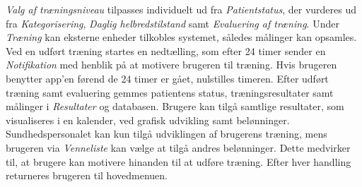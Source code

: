 \textit{Valg af træningsniveau} tilpasses individuelt ud fra \textit{Patientstatus}, der vurderes ud fra \textit{Kategorisering}, \textit{Daglig helbredstilstand} samt \textit{Evaluering af træning}.
Under \textit{Træning} kan eksterne enheder tilkobles systemet, således målinger kan opsamles. Ved en udført træning startes en nedtælling, som efter 24 timer sender en \textit{Notifikation} med henblik på at motivere brugeren til træning. Hvis brugeren benytter app'en førend de 24 timer er gået, nulstilles timeren.
Efter udført træning samt evaluering gemmes patientens status, træningsresultater samt målinger i \textit{Resultater} og databasen. 
Brugere kan tilgå samtlige resultater, som visualiseres i en kalender, ved grafisk udvikling samt belønninger. Sundhedspersonalet kan kun tilgå udviklingen af brugerens træning, mens brugeren via \textit{Venneliste} kan vælge at tilgå andres belønninger. Dette medvirker til, at brugere kan motivere hinanden til at udføre træning. Efter hver handling returneres brugeren til hovedmenuen.